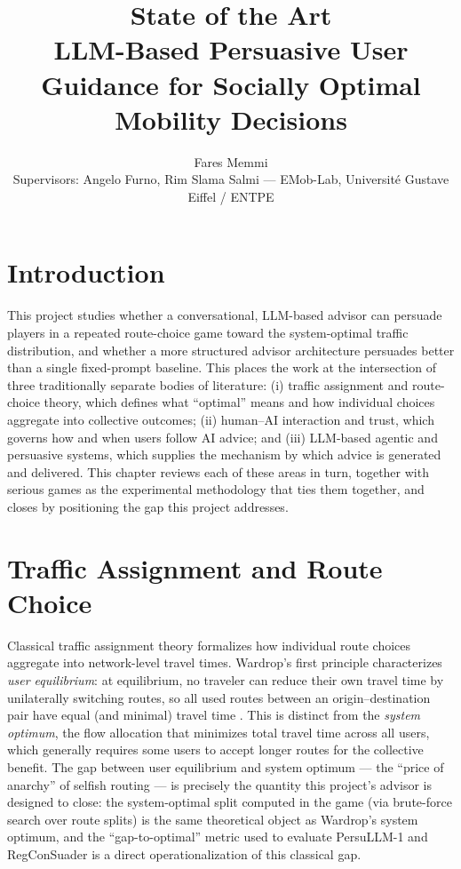 \documentclass[11pt]{article}
\title{State of the Art \\ \large LLM-Based Persuasive User Guidance for Socially Optimal Mobility Decisions}
\author{Fares Memmi \\ \small Supervisors: Angelo Furno, Rim Slama Salmi --- EMob-Lab, Universit\'e Gustave Eiffel / ENTPE}
\date{}
\begin{document}
\maketitle

\section*{Introduction}
This project studies whether a conversational, LLM-based advisor can persuade players in a repeated route-choice game toward the system-optimal traffic distribution, and whether a more structured advisor architecture persuades better than a single fixed-prompt baseline. This places the work at the intersection of three traditionally separate bodies of literature: (i) traffic assignment and route-choice theory, which defines what ``optimal'' means and how individual choices aggregate into collective outcomes; (ii) human--AI interaction and trust, which governs how and when users follow AI advice; and (iii) LLM-based agentic and persuasive systems, which supplies the mechanism by which advice is generated and delivered. This chapter reviews each of these areas in turn, together with serious games as the experimental methodology that ties them together, and closes by positioning the gap this project addresses.

\section{Traffic Assignment and Route Choice}
Classical traffic assignment theory formalizes how individual route choices aggregate into network-level travel times. Wardrop's first principle characterizes \emph{user equilibrium}: at equilibrium, no traveler can reduce their own travel time by unilaterally switching routes, so all used routes between an origin--destination pair have equal (and minimal) travel time \citep{wardrop1952}. This is distinct from the \emph{system optimum}, the flow allocation that minimizes total travel time across all users, which generally requires some users to accept longer routes for the collective benefit. The gap between user equilibrium and system optimum --- the ``price of anarchy'' of selfish routing --- is precisely the quantity this project's advisor is designed to close: the system-optimal split computed in the game (via brute-force search over route splits) is the same theoretical object as Wardrop's system optimum, and the ``gap-to-optimal'' metric used to evaluate PersuLLM-1 and RegConSuader is a direct operationalization of this classical gap.
\end{document}

